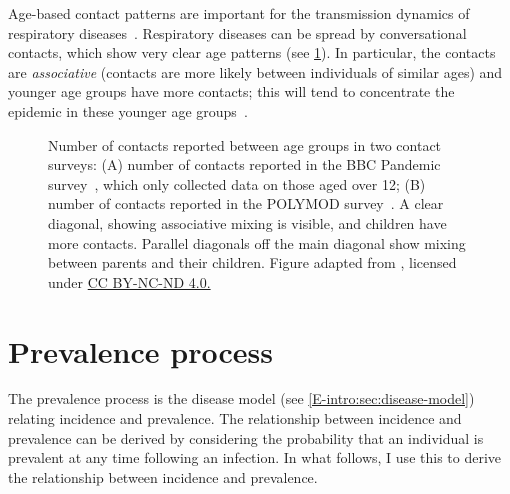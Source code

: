 \documentclass[thesis.tex]{subfiles}
\begin{document}
Age-based contact patterns are important for the transmission dynamics of respiratory diseases~\autocite{birrellBayesian,jacksonEffects}.
Respiratory diseases can be spread by conversational contacts, which show very clear age patterns (see \cref{SEIR:fig:age-contacts}).
In particular, the contacts are \emph{associative} (contacts are more likely between individuals of similar ages) and younger age groups have more contacts; this will tend to concentrate the epidemic in these younger age groups~\autocite[67]{keelingModeling}.
\begin{figure}
  \caption[Age-based contact matrices]{Number of contacts reported between age groups in two contact surveys: (A) number of contacts reported in the BBC Pandemic survey~\autocite{klepacContacts}, which only collected data on those aged over 12; (B) number of contacts reported in the POLYMOD survey~\autocite{mossongSocial}. A clear diagonal, showing associative mixing is visible, and children have more contacts. Parallel diagonals off the main diagonal show mixing between parents and their children. Figure adapted from \textcite{klepacContacts}, licensed under \href{https://creativecommons.org/licenses/by-nc-nd/4.0/}{CC BY-NC-ND 4.0.}}
  \label{SEIR:fig:age-contacts}
\end{figure}

\section{Prevalence process} \label{inc-prev:sec:prevalence-process}

The prevalence process is the disease model (see \cref{E-intro:sec:disease-model}) relating incidence and prevalence.
The relationship between incidence and prevalence can be derived by considering the probability that an individual is prevalent at any time following an infection.
In what follows, I use this to derive the relationship between incidence and prevalence.
\end{document}
